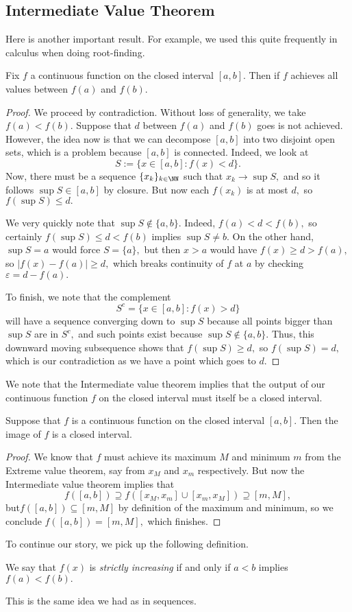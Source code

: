 \subsection{Intermediate Value Theorem}
Here is another important result. For example, we used this quite frequently in calculus when doing root-finding.
\begin{theorem}
	Fix $f$ a continuous function on the closed interval $[a,b].$ Then if $f$ achieves all values between $f(a)$ and $f(b).$
\end{theorem}
\begin{proof}
	We proceed by contradiction. Without loss of generality, we take $f(a)<f(b).$ Suppose that $d$ between $f(a)$ and $f(b)$ goes is not achieved. However, the idea now is that we can decompose $[a,b]$ into two disjoint open sets, which is a problem because $[a,b]$ is connected. Indeed, we look at
	\[S:=\{x\in[a,b]:f(x)<d\}.\]
	Now, there must be a sequence $\{x_k\}_{k\in\NN}$ such that $x_k\to\sup S,$ and so it follows $\sup S\in[a,b]$ by closure. But now each $f(x_k)$ is at most $d,$ so $f(\sup S)\le d.$

	We very quickly note that $\sup S\notin\{a,b\}.$ Indeed, $f(a)<d<f(b),$ so certainly $f(\sup S)\le d<f(b)$ implies $\sup S\ne b.$ On the other hand, $\sup S=a$ would force $S=\{a\},$ but then $x>a$ would have $f(x)\ge d>f(a),$ so $|f(x)-f(a)|\ge d,$ which breaks continuity of $f$ at $a$ by checking $\varepsilon=d-f(a).$

	To finish, we note that the complement
	\[S^c=\{x\in[a,b]:f(x)>d\}\]
	will have a sequence converging down to $\sup S$ because all points bigger than $\sup S$ are in $S^c,$ and such points exist because $\sup S\notin\{a,b\}.$ Thus, this downward moving subsequence shows that $f(\sup S)\ge d,$ so $f(\sup S)=d,$ which is our contradiction as we have a point which goes to $d.$
\end{proof}
We note that the Intermediate value theorem implies that the output of our continuous function $f$ on the closed interval must itself be a closed interval.
\begin{cor}
	Suppose that $f$ is a continuous function on the closed interval $[a,b].$ Then the image of $f$ is a closed interval.
\end{cor}
\begin{proof}
	We know that $f$ must achieve its maximum $M$ and minimum $m$ from the Extreme value theorem, say from $x_M$ and $x_m$ respectively. But now the Intermediate value theorem implies that
	\[f([a,b])\supseteq f\left([x_M,x_m]\cup[x_m,x_M]\right)\supseteq[m,M],\]
	but$ f\left([a,b]\right)\subseteq[m,M]$ by definition of the maximum and minimum, so we conclude $f([a,b])=[m,M],$ which finishes.
\end{proof}
To continue our story, we pick up the following definition.
\begin{definition}
	We say that $f(x)$ is \textit{strictly increasing} if and only if $a<b$ implies $f(a)<f(b).$
\end{definition}
This is the same idea we had as in sequences.

